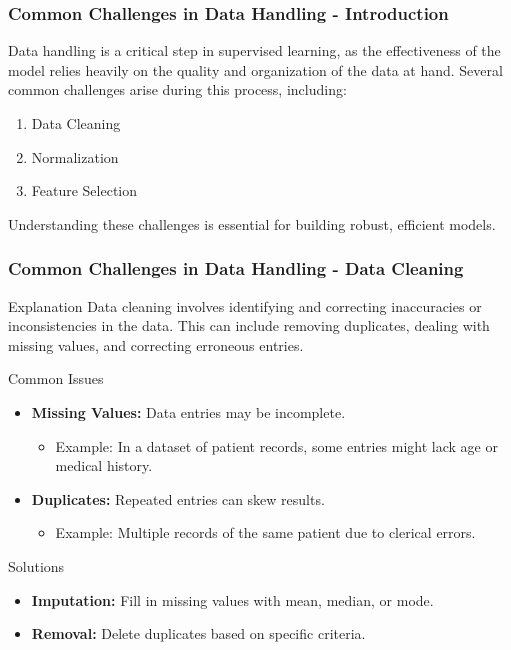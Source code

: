 \documentclass[aspectratio=169]{beamer}
\begin{document}
\begin{frame}[fragile]
    \frametitle{Common Challenges in Data Handling - Introduction}
    Data handling is a critical step in supervised learning, as the effectiveness of the model relies heavily on the quality and organization of the data at hand. Several common challenges arise during this process, including:
    
    \begin{enumerate}
        \item Data Cleaning
        \item Normalization
        \item Feature Selection
    \end{enumerate}
    
    Understanding these challenges is essential for building robust, efficient models.
\end{frame}

\begin{frame}[fragile]
    \frametitle{Common Challenges in Data Handling - Data Cleaning}
    \begin{block}{Explanation}
        Data cleaning involves identifying and correcting inaccuracies or inconsistencies in the data. This can include removing duplicates, dealing with missing values, and correcting erroneous entries.
    \end{block}

    \begin{block}{Common Issues}
        \begin{itemize}
            \item \textbf{Missing Values:} Data entries may be incomplete. 
            \begin{itemize}
                \item Example: In a dataset of patient records, some entries might lack age or medical history.
            \end{itemize}
            \item \textbf{Duplicates:} Repeated entries can skew results.
            \begin{itemize}
                \item Example: Multiple records of the same patient due to clerical errors.
            \end{itemize}
        \end{itemize}
    \end{block}

    \begin{block}{Solutions}
        \begin{itemize}
            \item \textbf{Imputation:} Fill in missing values with mean, median, or mode.
            \item \textbf{Removal:} Delete duplicates based on specific criteria.
        \end{itemize}
    \end{block}
\end{frame}
\end{document}
